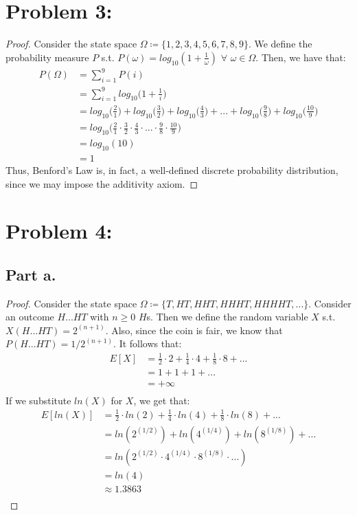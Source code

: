 \documentclass{article}
\begin{document}
\section*{Problem 3:}
\begin{proof}
Consider the state space $\Omega \coloneqq \{1, 2, 3, 4, 5, 6, 7, 8, 9\}$. We define the probability measure $P$ s.t. $P(\omega) = log_{10}(1 + \frac{1}{\omega})$ $\forall$ $\omega \in \Omega$. Then, we have that:
\begin{align*}
P(\Omega) &= \sum\limits_{i = 1}^9 P(i) \\
&= \sum\limits_{i = 1}^9 log_{10}\bigg(1 + \frac{1}{i}\bigg) \\
&= log_{10}\bigg(\frac{2}{1}\bigg) + log_{10}\bigg(\frac{3}{2}\bigg) + log_{10}\bigg(\frac{4}{3}\bigg) + ... + log_{10}\bigg(\frac{9}{8}\bigg) + log_{10}\bigg(\frac{10}{9}\bigg) \\
&= log_{10}\bigg(\frac{2}{1} \cdot \frac{3}{2} \cdot \frac{4}{3} \cdot ... \cdot \frac{9}{8} \cdot \frac{10}{9}\bigg) \\
&= log_{10}(10) \\
&= 1
\end{align*}
Thus, Benford's Law is, in fact, a well-defined discrete probability distribution, since we may impose the additivity axiom.
\end{proof}

\section*{Problem 4:}

\subsection*{Part a.}
\begin{proof}
Consider the state space $\Omega \coloneqq \{T, HT, HHT, HHHT, HHHHT, ...\}$. Consider an outcome $H ... HT$ with $n \geq 0$ $H$s. Then we define the random variable $X$ s.t. $X(H ... HT) = 2^{(n + 1)}$. Also, since the coin is fair, we know that $P(H ... HT) = 1 / 2^{(n + 1)}$. It follows that:
\begin{align*}
E[X] &= \frac{1}{2} \cdot 2 + \frac{1}{4} \cdot 4 + \frac{1}{8} \cdot 8 + ... \\
&= 1 + 1 + 1 + ... \\
&= + \infty \\
\end{align*}
If we substitute $ln(X)$ for $X$, we get that:
\begin{align*}
E[ln(X)] &= \frac{1}{2} \cdot ln(2) + \frac{1}{4} \cdot ln(4) + \frac{1}{8} \cdot ln(8) + ... \\
&= ln(2^{(1/2)}) + ln(4^{(1/4)}) + ln(8^{(1/8)}) + ... \\
&= ln(2^{(1/2)} \cdot 4^{(1/4)} \cdot 8^{(1/8)} \cdot ...) \\
&= ln(4) \\
&\approx 1.3863 \\
\end{align*}
\end{proof}
\end{document}
